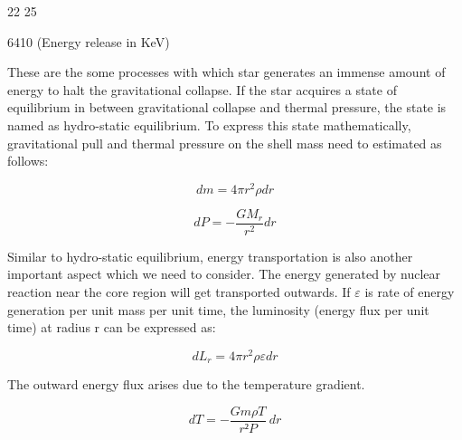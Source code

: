 \vspace{1cm}

\begin{center}
	
\end{center}
\vspace{-2mm}
\hspace{7.6cm} {\scriptsize 22 \hspace{0.9cm} 25 \hfill {} \\
	
	\vspace{-2mm}
	
	\hspace{7.6cm} 6410 \hfill (Energy release in KeV)}

\vspace{1cm}


These are the some processes with which star generates an immense amount of energy to halt the gravitational collapse. If the star acquires a state of equilibrium in between gravitational collapse and thermal pressure, the state is named as hydro-static equilibrium. To express this state mathematically, gravitational pull and thermal pressure on the shell mass need to estimated as follows:

\begin{equation}
dm = 4 \pi r^2 \rho dr
\end{equation}

\begin{equation}
dP = - \frac{G M_r}{r^2} dr
\end{equation}

Similar to hydro-static equilibrium, energy transportation is also another important aspect which we need to consider. The energy generated by nuclear reaction near the core region will get transported outwards. If $\varepsilon$ is rate of energy generation per unit mass per unit time, the luminosity (energy flux per unit time) at radius r can be expressed as: 

\begin{equation}
dL_r = 4 \pi r^2 \rho \varepsilon dr
\end{equation}

The outward energy flux arises due to the temperature gradient.

\begin{equation}
dT = - \frac{G m \rho T	}{r² P} \ dr
\end{equation}

